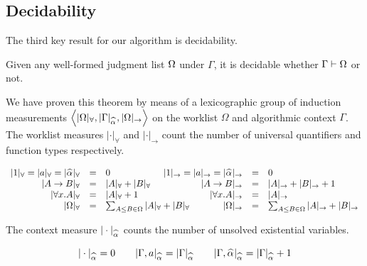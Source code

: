 \subsection{Decidability}

The third key result for our algorithm is decidability.
\begin{theorem}[Decidability]
	Given any well-formed judgment list $\Omega$ under $\Gamma$, it is decidable whether $\Gamma\vdash \Omega$ or not.
\end{theorem}

\noindent We have proven this theorem by means of a lexicographic group of induction
measurements $\left\langle|\Omega|_\forall,|\Gamma|_{\al}, |\Omega|_\to\right\rangle$ on the worklist $\Omega$
and algorithmic context $\Gamma$. 
The worklist measures $|\cdot|_\forall$ and $|\cdot|_\to$ count the
number of universal quantifiers and function types respectively.
\begin{definition}
\[
\begin{array}{rcl@{\hspace{-10mm}}rclrcl} 
|1|_\forall = |a|_\forall = |\al|_\forall &=& 0      &|1|_\to = |a|_\to = |\al|_\to &=& 0        \\
|A\to B|_\forall &=& |A|_\forall + |B|_\forall  &|A\to B|_\to &=& |A|_\to + |B|_\to + 1\\
|\forall x. A|_\forall &=& |A|_\forall + 1              &|\forall x. A|_\to &=& |A|_\to                        \\
|\exps|_\forall &=& \sum_{A \le B\in \exps} |A|_\forall + |B|_\forall       &|\exps|_\to &=& \sum_{A \le B \in \exps} |A|_\to + |B|_\to
\end{array}
\]
\end{definition}

\noindent The context measure $|\cdot|_{\al}$ counts the number of unsolved existential variables.
\begin{definition}
$$|\cdot|_{\al} = 0\qquad
|\Gamma,a|_{\al} = |\Gamma|_{\al}\qquad
|\Gamma,\al|_{\al} = |\Gamma|_{\al} + 1$$
\end{definition}

